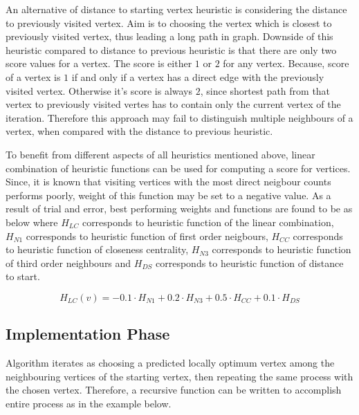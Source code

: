 \documentclass[12pt]{report}
\begin{document}
            An alternative of distance to starting vertex heuristic is considering the distance to previously visited vertex. Aim is to choosing the vertex which is closest to previously
            visited vertex, thus leading a long path in graph. Downside of this heuristic compared to distance to previous heuristic is that there are only two score values for a vertex.
            The score is either $1$ or $2$ for any vertex. Because, score of a vertex is $1$ if and only if a vertex has a direct edge with the previously visited vertex. Otherwise it's score is always $2$, 
            since shortest path from that vertex to previously visited vertes has to contain only the current vertex of the iteration. Therefore this approach may fail to distinguish multiple
            neighbours of a vertex, when compared with the distance to previous heuristic.
            \newline

            To benefit from different aspects of all heuristics mentioned above, linear combination of heuristic functions can be used for computing a score for vertices. Since, it is known that visiting
            vertices with the most direct neigbour counts performs poorly, weight of this function may be set to a negative value. As a result of trial and error, best performing weights and functions are
            found to be as below where $H_{LC}$ corresponds to heuristic function of the linear combination, $H_{N1}$ corresponds to heuristic function of first order neigbours, $H_{CC}$ corresponds to
            heuristic function of closeness centrality, $H_{N3}$ corresponds to heuristic function of third order neighbours and $H_{DS}$ corresponds to heuristic function of distance to start.

            \begin{equation}
                H_{LC}(v) = -0.1\cdot H_{N1} + 0.2\cdot H_{N3} + 0.5\cdot H_{CC} + 0.1\cdot H_{DS}
            \end{equation}

        \subsection{Implementation Phase}
            Algorithm iterates as choosing a predicted locally optimum vertex among the neighbouring vertices of the starting vertex, then repeating the same process with the chosen vertex. 
            Therefore, a recursive function can be written to accomplish entire process as in the example below.
\end{document}
